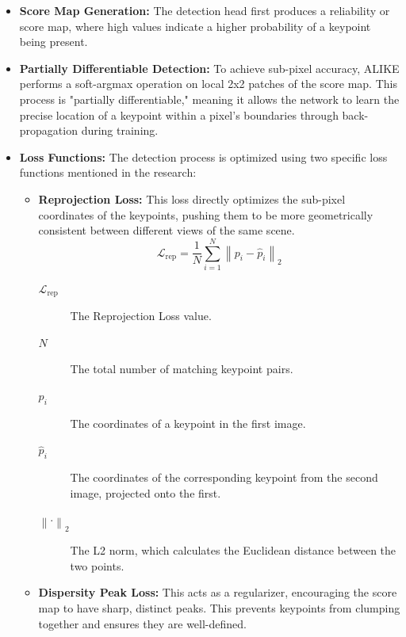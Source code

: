 \begin{itemize}
    \item \textbf{Score Map Generation:} The detection head first produces a reliability or score map, where high values indicate a higher probability of a keypoint being present.
    \item \textbf{Partially Differentiable Detection:} To achieve sub-pixel accuracy, ALIKE performs a soft-argmax operation on local 2x2 patches of the score map. This process is "partially differentiable," meaning it allows the network to learn the precise location of a keypoint within a pixel's boundaries through back-propagation during training.
    \item \textbf{Loss Functions:} The detection process is optimized using two specific loss functions mentioned in the research:
          \begin{itemize}
              \item \textbf{Reprojection Loss:} This loss directly optimizes the sub-pixel coordinates of the keypoints, pushing them to be more geometrically consistent between different views of the same scene.
                    \begin{equation*}
                        \mathcal{L}_{\text{rep}} = \frac{1}{N} \sum_{i=1}^{N} \left\| p_i - \hat{p}_i \right\|_2
                    \end{equation*}
                    {\footnotesize
                    \begin{description}
                        \item[$\mathcal{L}_{\text{rep}}$] The Reprojection Loss value.
                        \item[$N$] The total number of matching keypoint pairs.
                        \item[$p_i$] The coordinates of a keypoint in the first image.
                        \item[$\hat{p}_i$] The coordinates of the corresponding keypoint from the second image, projected onto the first.
                        \item[$\left\| \cdot \right\|_2$] The L2 norm, which calculates the Euclidean distance between the two points.
                    \end{description}}
              \item \textbf{Dispersity Peak Loss:} This acts as a regularizer, encouraging the score map to have sharp, distinct peaks. This prevents keypoints from clumping together and ensures they are well-defined.

\end{itemize}
\end{itemize}
